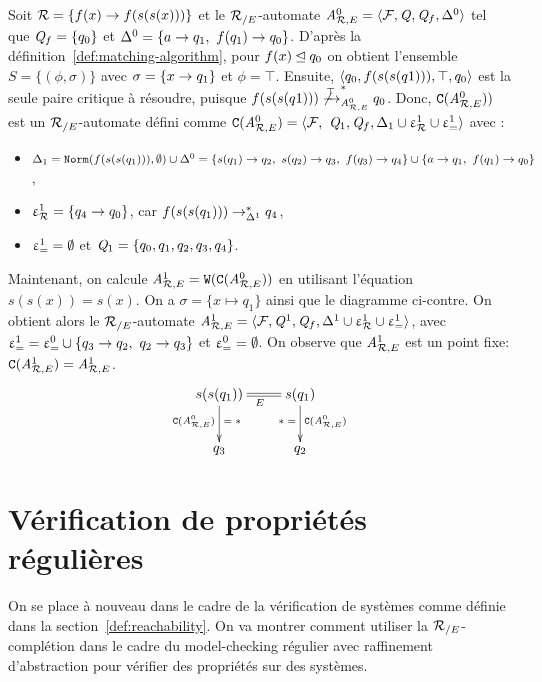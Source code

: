 \begin{example}
  \label{ex:W}
  Soit $\mathcal R = \{f(x) \rightarrow f(s(s(x)))\}$ et le ${\mathcal R_{/E}}$-automate
  ${\mathit A}_{\mathcal R,E}^0 = \langle\mathcal{F},\mathit Q,\mathit Q_f,\Delta^0\rangle$ tel que $\mathit Q_f = \{q_0\}$
  et $\Delta^0 = \{a \rightarrow q_1,\ f(q_1) \rightarrow q_0\}$.
  D'après la définition~\ref{def:matching-algorithm}, pour $f(x) \unlhd q_0$ on obtient l'ensemble $S = \{(\phi,\sigma)\}$
  avec $\sigma = \{x \rightarrow q_1\}$ et $\phi = \top$. Ensuite,
  $\langle q_0, f(s(s(q1))), \top, q_0\rangle$ est la seule paire critique à résoudre, puisque 
  $f(s(s(q1))) \not\xrightarrow{\top}^*_{{\mathit A}_{\mathcal R,E}^0} q_0$. Donc, $\mathtt{C}({\mathit A}_{\mathcal R,E}^0))$ est un ${\mathcal R_{/E}}$-automate défini comme
  $\mathtt{C}({\mathit A}_{\mathcal R,E}^0) = \langle\mathcal{F},\ \mathit Q_1, \mathit Q_f, \Delta_1 \cup \upvarepsilon_{\mathcal R}^1 \cup \upvarepsilon_{=}^1 \rangle$ avec :
  \begin{itemize}
  \item  $\Delta_1 = \mathtt{Norm}(f(s(s(q_1))),\emptyset) \cup \Delta^0 =
    \{s(q_1) \rightarrow q_2,\ s(q_2) \rightarrow q_3,\ f(q_3) \rightarrow q_4\} \cup \{a \rightarrow q_1,\ f(q_1) \rightarrow q_0\}$,
  \item
    $\upvarepsilon_{\mathcal R}^1 = \{q_4 \rightarrow q_0\}$, car $f(s(s(q_1))) \rightarrow_{\Delta^1}^* q_4$,
  \item $\upvarepsilon_{=}^1 = \emptyset$ et $\mathit Q_1 = \{q_0,q_1,q_2,q_3,q_4\}$.
  \end{itemize}

  Maintenant, on calcule ${\mathit A}_{\mathcal R,E}^1 = \mathtt{W}(\mathtt{C}({\mathit A}_{\mathcal R,E}^0))$ en utilisant l'équation
  $s(s(x))=s(x)$.  On a $\sigma=\{x \mapsto q_1\}$ ainsi que le diagramme ci-contre.
  On obtient alors le ${\mathcal R_{/E}}$-automate ${\mathit A}_{\mathcal R,E}^1 = \langle \mathcal{F}, \mathit Q^1, \mathit Q_f, \Delta^1 \cup \upvarepsilon_{\mathcal R}^1 \cup \upvarepsilon_{=}^1\rangle$,
  avec $\upvarepsilon_{=}^1= \upvarepsilon_{=}^0 \cup \{q_3 \rightarrow q_2,\ q_2 \rightarrow q_3\}$ et $\upvarepsilon_{=}^0=\emptyset$.  On observe que ${\mathit A}_{\mathcal R,E}^1$
  est un point fixe: $\mathtt{C}({\mathit A}_{\mathcal R,E}^1) = {\mathit A}_{\mathcal R,E}^1$.
  \[\xymatrix{
    s(s(q_1)) \ar@{=}[r]_{E}\ar[d]^{=\; *}_{\compl(\aaexeq^0)} & s(q_1) \ar[d]^{\compl(\aaexeq^0)}_{*\; =}\\
    q_3 & q_2
  }\]
\end{example}


\section{Vérification de propriétés régulières}
On se place à nouveau dans le cadre de la vérification de systèmes comme définie dans la section~\ref{def:reachability}.
On va montrer comment utiliser la ${\mathcal R_{/E}}$-complétion  dans le cadre du model-checking régulier 
avec raffinement d'abstraction pour vérifier des propriétés sur des systèmes.

